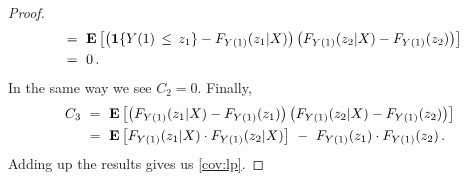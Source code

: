 \begin{proof}
\begin{align*}
  &
  \ 
  =
  \ 
 \E
  \left[
\left( 
\mathbf{1}{\left\{ Y(1)\,\le\, z_1 \right\}}
-
F_{Y(1)}(z_1|X)
\right)
  \left( 
  F_{Y(1)}(z_2|X)
  -
F_{Y(1)}(z_2)
  \right)
  \right]
  \\
  &
  \ 
  =
  \ 
  0
  \,.
\end{align*}
In the same way we see $C_2=0$. Finally,
\begin{align*}
  C_3
  &
  \ 
  =
  \ 
  \E
  \left[
  \left( 
  F_{Y(1)}(z_1|X)
  -
F_{Y(1)}(z_1)
  \right)
  \left( 
  F_{Y(1)}(z_2|X)
  -
F_{Y(1)}(z_2)
  \right)
  \right]
  \\
  &
  \ 
  =
  \ 
  \E
  \left[
  F_{Y(1)}(z_1|X)
  \cdot
  F_{Y(1)}(z_2|X)
  \right]
  \ 
  -
  \ 
  F_{Y(1)}(z_1)
  \cdot
  F_{Y(1)}(z_2)
  \,.
\end{align*}
Adding up the results gives us \eqref{cov:lp}.
\end{proof}

